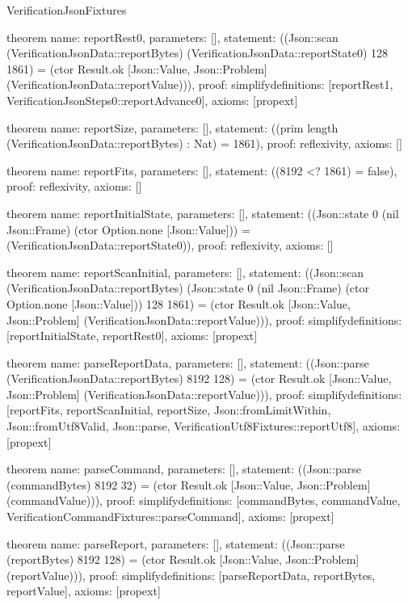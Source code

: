 \begin{lexlean}{VerificationJsonFixtures}
\begin{semanticmodule}
theorem{
  name: reportRest0,
  parameters: [],
  statement: ((Json::scan (VerificationJsonData::reportBytes) (VerificationJsonData::reportState0) 128 1861) = (ctor Result.ok [Json::Value, Json::Problem] (VerificationJsonData::reportValue))),
  proof: simplify{definitions: [reportRest1, VerificationJsonSteps0::reportAdvance0]},
  axioms: [propext]
}

theorem{
  name: reportSize,
  parameters: [],
  statement: ((prim length (VerificationJsonData::reportBytes) : Nat) = 1861),
  proof: reflexivity{},
  axioms: []
}

theorem{
  name: reportFits,
  parameters: [],
  statement: ((8192 <? 1861) = false),
  proof: reflexivity{},
  axioms: []
}

theorem{
  name: reportInitialState,
  parameters: [],
  statement: ((Json::state 0 (nil Json::Frame) (ctor Option.none [Json::Value])) = (VerificationJsonData::reportState0)),
  proof: reflexivity{},
  axioms: []
}

theorem{
  name: reportScanInitial,
  parameters: [],
  statement: ((Json::scan (VerificationJsonData::reportBytes) (Json::state 0 (nil Json::Frame) (ctor Option.none [Json::Value])) 128 1861) = (ctor Result.ok [Json::Value, Json::Problem] (VerificationJsonData::reportValue))),
  proof: simplify{definitions: [reportInitialState, reportRest0]},
  axioms: [propext]
}

theorem{
  name: parseReportData,
  parameters: [],
  statement: ((Json::parse (VerificationJsonData::reportBytes) 8192 128) = (ctor Result.ok [Json::Value, Json::Problem] (VerificationJsonData::reportValue))),
  proof: simplify{definitions: [reportFits, reportScanInitial, reportSize, Json::fromLimitWithin, Json::fromUtf8Valid, Json::parse, VerificationUtf8Fixtures::reportUtf8]},
  axioms: [propext]
}

theorem{
  name: parseCommand,
  parameters: [],
  statement: ((Json::parse (commandBytes) 8192 32) = (ctor Result.ok [Json::Value, Json::Problem] (commandValue))),
  proof: simplify{definitions: [commandBytes, commandValue, VerificationCommandFixtures::parseCommand]},
  axioms: [propext]
}

theorem{
  name: parseReport,
  parameters: [],
  statement: ((Json::parse (reportBytes) 8192 128) = (ctor Result.ok [Json::Value, Json::Problem] (reportValue))),
  proof: simplify{definitions: [parseReportData, reportBytes, reportValue]},
  axioms: [propext]
}

\end{semanticmodule}
\end{lexlean}
